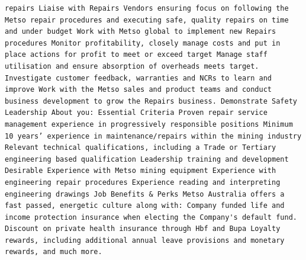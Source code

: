 \documentclass[11pt,a4paper,]{article}
\begin{document}
\begin{verbatim}
repairs Liaise with Repairs Vendors ensuring focus on following the Metso repair procedures and executing safe, quality repairs on time and under budget Work with Metso global to implement new Repairs procedures Monitor profitability, closely manage costs and put in place actions for profit to meet or exceed target Manage staff utilisation and ensure absorption of overheads meets target. Investigate customer feedback, warranties and NCRs to learn and improve Work with the Metso sales and product teams and conduct business development to grow the Repairs business. Demonstrate Safety Leadership About you: Essential Criteria Proven repair service management experience in progressively responsible positions Minimum 10 years’ experience in maintenance/repairs within the mining industry Relevant technical qualifications, including a Trade or Tertiary engineering based qualification Leadership training and development Desirable Experience with Metso mining equipment Experience with engineering repair procedures Experience reading and interpreting engineering drawings Job Benefits & Perks Metso Australia offers a fast passed, energetic culture along with: Company funded life and income protection insurance when electing the Company's default fund. Discount on private health insurance through Hbf and Bupa Loyalty rewards, including additional annual leave provisions and monetary rewards, and much more.

\end{verbatim}
\end{document}
